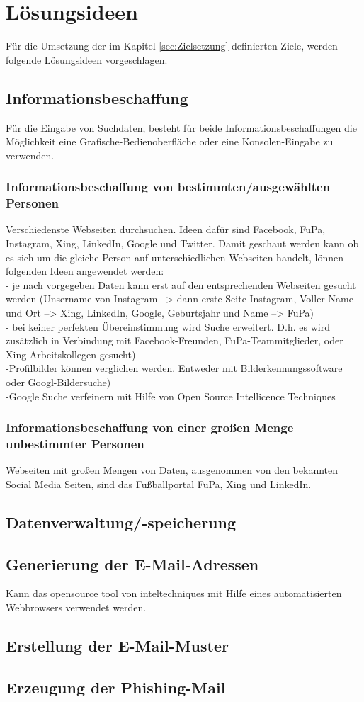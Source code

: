 
\chapter{Lösungsideen}  %
\label{cha:Lösungsideen} %
Für die Umsetzung der im Kapitel \ref{sec:Zielsetzung} definierten Ziele, werden folgende Lösungsideen vorgeschlagen.

\section{Informationsbeschaffung} %
Für die Eingabe von Suchdaten, besteht für beide Informationsbeschaffungen die Möglichkeit eine Grafische-Bedienoberfläche oder eine Konsolen-Eingabe zu verwenden.
	\subsection{Informationsbeschaffung von bestimmten/ausgewählten Personen}
	Verschiedenste Webseiten durchsuchen. Ideen dafür sind Facebook, FuPa, Instagram, Xing, LinkedIn, Google und Twitter. Damit geschaut werden kann ob es sich um die gleiche Person auf unterschiedlichen Webseiten handelt, lönnen folgenden Ideen angewendet werden:\\
		- je nach vorgegeben Daten kann erst auf den entsprechenden Webseiten gesucht werden (Unsername von Instagram --> dann erste Seite Instagram, Voller Name und Ort --> Xing, LinkedIn, Google, Geburtsjahr und Name --> FuPa)\\
		- bei keiner perfekten Übereinstimmung wird Suche erweitert. D.h. es wird zusätzlich in Verbindung mit Facebook-Freunden, FuPa-Teammitglieder, oder Xing-Arbeitskollegen gesucht)\\
		-Profilbilder können verglichen werden. Entweder mit Bilderkennungssoftware oder Googl-Bildersuche)\\
		-Google Suche verfeinern mit Hilfe von Open Source Intellicence Techniques
		
	\subsection{Informationsbeschaffung von einer großen Menge unbestimmter Personen}
	Webseiten mit großen Mengen von Daten, ausgenommen von den bekannten Social Media Seiten, sind das Fußballportal FuPa, Xing und LinkedIn.
	
\section{Datenverwaltung/-speicherung}

\section{Generierung der E-Mail-Adressen}
Kann das opensource tool von inteltechniques mit Hilfe eines automatisierten Webbrowsers verwendet werden.

\section{Erstellung der E-Mail-Muster}

\section{Erzeugung der Phishing-Mail}
